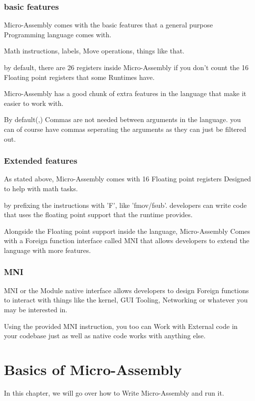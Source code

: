 \documentclass[a4paper,11pt]{book}
\begin{document}
\subsection{basic features}
Micro-Assembly comes with the basic features that a general purpose Programming language comes with.

Math instructions, labels, Move operations, things like that.

by default, there are 26 registers inside Micro-Assembly if you don't count the 16 Floating point registers
that some Runtimes have.

Micro-Assembly has a good chunk of extra features in the language that make it easier to work with.

By default(,) Commas are not needed between arguments in the language.
you can of course have commas seperating the arguments as they can just be filtered out.

\subsection{Extended features}

As stated above, Micro-Assembly comes with 16 Floating point registers Designed
to help with math tasks.

by prefixing the instructions with 'F', like 'fmov/fsub'. developers can write code that uses the floating point support that the runtime provides.

Alongside the Floating point support inside the language, Micro-Assembly Comes with a Foreign function interface called MNI that allows developers to extend the language with more features.

\subsection{MNI}\label{subpar:MNI}
MNI or the Module native interface allows developers to design Foreign functions to interact with things like the kernel, GUI Tooling, Networking or whatever you may be interested in.

Using the provided MNI instruction, you too can Work with External code in your codebase just as well as native code works with anything else.

\chapter{Basics of Micro-Assembly}
In this chapter, we will go over how to Write Micro-Assembly and run it.
\end{document}
